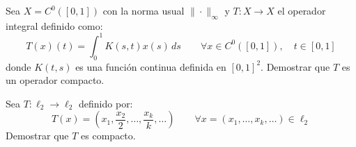 \begin{ejercicio} %
    Sea $X = C^0([0,1])$ con la norma usual $\|\cdot\|_\infty$ y $T: X \longrightarrow X$ el operador integral definido como:
    \[ T(x)(t) = \int_{0}^{1} K(s,t) x(s) \, ds \qquad \forall x \in C^0([0,1]), \quad t \in [0,1] \]
    donde $K(t,s)$ es una función continua definida en $[0,1]^2$. Demostrar que $T$ es un operador compacto.
\end{ejercicio}

\begin{ejercicio}
    Sea $T: \ell_2 \longrightarrow \ell_2$ definido por:
    \[ T(x) = \left( x_1, \frac{x_2}{2}, \dots, \frac{x_k}{k}, \dots \right) \qquad \forall x = (x_1, \dots, x_k, \dots) \in \ell_2 \]
    Demostrar que $T$ es compacto. \\


\end{ejercicio}
